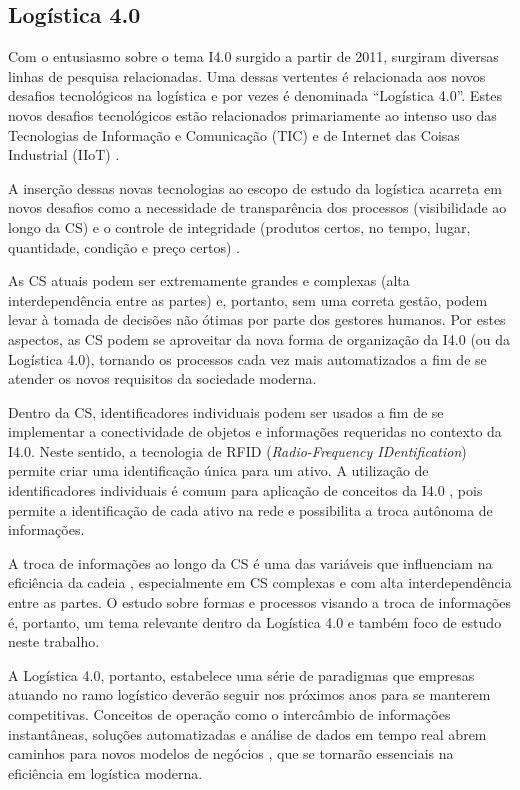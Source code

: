 \subsection{Logística 4.0}

Com o entusiasmo sobre o tema I4.0 surgido a partir de 2011, surgiram diversas linhas de pesquisa relacionadas. Uma dessas vertentes é relacionada aos novos desafios tecnológicos na logística e por vezes é denominada ``Logística 4.0''. Estes novos desafios tecnológicos estão relacionados primariamente ao intenso uso das Tecnologias de Informação e Comunicação (TIC) e de Internet das Coisas Industrial (IIoT) \cite{barreto2017industry}.

A inserção dessas novas tecnologias ao escopo de estudo da logística acarreta em novos desafios como a necessidade de transparência dos processos (visibilidade ao longo da CS) e o controle de integridade (produtos certos, no tempo, lugar, quantidade, condição e preço certos) \cite{barreto2017industry}.

As CS atuais podem ser extremamente grandes e complexas (alta interdependência entre as partes) e, portanto, sem uma correta gestão, podem levar à tomada de decisões não ótimas por parte dos gestores humanos. Por estes aspectos, as CS podem se aproveitar da nova forma de organização da I4.0 (ou da Logística 4.0), tornando os processos cada vez mais automatizados a fim de se atender os novos requisitos da sociedade moderna.

Dentro da CS, identificadores individuais podem ser usados a fim de se implementar a conectividade de objetos e informações requeridas no contexto da I4.0. Neste sentido, a tecnologia de RFID (\textit{Radio-Frequency IDentification}) permite criar uma identificação única para um ativo. A utilização de identificadores individuais é comum para aplicação de conceitos da I4.0 \cite{alyahya2016rfidwarehousing, vlachos2014rfidimpact, fan2015inventory, bibi2017rfidfood}, pois permite a identificação de cada ativo na rede e possibilita a troca autônoma de informações.

A troca de informações ao longo da CS é uma das variáveis que influenciam na eficiência da cadeia \cite{barreto2017industry}, especialmente em CS complexas e com alta interdependência entre as partes. O estudo sobre formas e processos visando a troca de informações é, portanto, um tema relevante dentro da Logística 4.0 e também foco de estudo neste trabalho.

A Logística 4.0, portanto, estabelece uma série de paradigmas que empresas atuando no ramo logístico deverão seguir nos próximos anos para se manterem competitivas. Conceitos de operação como o intercâmbio de informações instantâneas, soluções automatizadas e análise de dados em tempo real abrem caminhos para novos modelos de negócios \cite{strandhagen2017logistics}, que se tornarão essenciais na eficiência em logística moderna.

